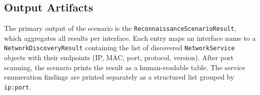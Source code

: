 \subsection{Output Artifacts}\label{subsec:reconnaissance-scenario-artifacts}

The primary output of the scenario is the \texttt{ReconnaissanceScenarioResult},
which aggregates all results per interface.
Each entry maps an interface name to a \texttt{NetworkDiscoveryResult} containing the list of discovered \texttt{NetworkService} objects with their endpoints (IP, MAC, port, protocol, version).
After port scanning, the scenario prints the result as a human-readable table.
The service enumeration findings are printed separately as a structured list grouped by \texttt{ip:port}.
